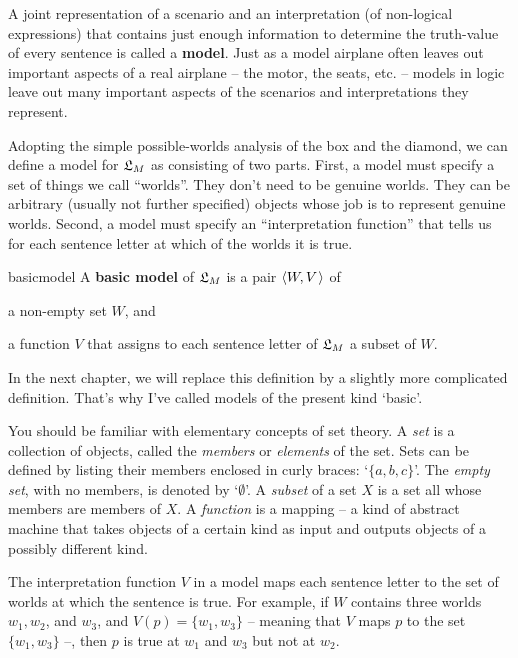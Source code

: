 A joint representation of a scenario and an interpretation (of non-logical
expressions) that contains just enough information to determine the truth-value
of every sentence is called a \textbf{model}. Just as a model airplane often
leaves out important aspects of a real airplane -- the motor, the seats, etc. --
models in logic leave out many important aspects of the scenarios and
interpretations they represent.

Adopting the simple possible-worlds analysis of the box and the diamond, we can
define a model for $\mathfrak{L}_{M}$ as consisting of two parts. First, a model must
specify a set of things we call ``worlds''. They don't need to be genuine
worlds. They can be arbitrary (usually not further specified) objects whose job
is to represent genuine worlds. Second, a model must specify an ``interpretation
function'' that tells us for each sentence letter at which of the worlds it is
true.

\begin{definition}{}{basicmodel}
  A \textbf{basic model} of $\mathfrak{L}_M$ is a pair $\t{W,V}$ of%
  \vspace{-3mm}
  \begin{itemize*}
  \item a non-empty set $W$, and
  \item a function $V$ that assigns to each sentence letter of $\mathfrak{L}_M$
  a subset of $W$.
  \end{itemize*}
\end{definition}
\noindent
In the next chapter, we will replace this definition by a slightly more
complicated definition. That's why I've called models of the present kind
`basic'.

You should be familiar with elementary concepts of set theory. A \emph{set} is
a collection of objects, called the \emph{members} or \emph{elements} of the
set. Sets can be defined by listing their members enclosed in curly braces:
`$\{ a, b, c \}$'. The \emph{empty set}, with no members, is denoted by
`$\emptyset$'. A \emph{subset} of a set $X$ is a set all whose members are
members of $X$. A \emph{function} is a mapping -- a kind of abstract machine
that takes objects of a certain kind as input and outputs objects of a possibly
different kind.

The interpretation function $V$ in a model maps each sentence letter to the set
of worlds at which the sentence is true. For example, if $W$ contains three
worlds $w_{1}, w_{2}$, and $w_{3}$, and $V(p) = \{ w_{1}, w_{3} \}$ -- meaning
that $V$ maps $p$ to the set $\{ w_{1}, w_{3} \}$ --, then $p$ is true at
$w_{1}$ and $w_{3}$ but not at $w_{2}$.

